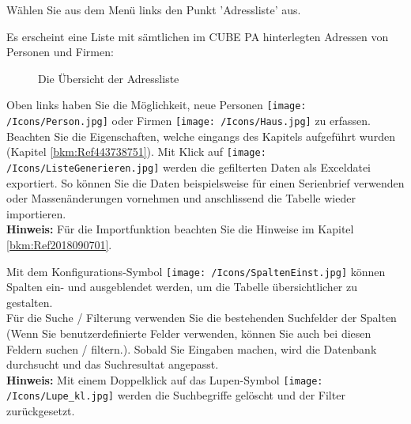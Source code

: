 Wählen Sie aus dem Menü links den Punkt 'Adressliste' aus.

\vspace{7cm}

Es erscheint eine Liste mit sämtlichen im CUBE PA hinterlegten Adressen von Personen und Firmen:

\begin{figure}[H]
\caption{Die Übersicht der Adressliste}
\end{figure}

Oben links haben Sie die Möglichkeit, neue Personen \texttt{[image: /Icons/Person.jpg]} oder Firmen \texttt{[image: /Icons/Haus.jpg]} zu erfassen. Beachten Sie die Eigenschaften, welche eingangs des Kapitels aufgeführt wurden (Kapitel \ref{bkm:Ref443738751}). \newline
Mit Klick auf \texttt{[image: /Icons/ListeGenerieren.jpg]}  werden die gefilterten Daten als Exceldatei exportiert. So können Sie die Daten beispielsweise für einen Serienbrief verwenden oder Massenänderungen vornehmen und anschlissend die Tabelle wieder importieren. \\
\textbf{Hinweis:} Für die Importfunktion beachten Sie die Hinweise im Kapitel \ref{bkm:Ref2018090701}.

\vspace{\baselineskip}

Mit dem Konfigurations-Symbol \texttt{[image: /Icons/SpaltenEinst.jpg]}  können Spalten ein- und ausgeblendet werden, um die Tabelle übersichtlicher zu gestalten. \\
Für die Suche / Filterung verwenden Sie die bestehenden Suchfelder  der Spalten (Wenn Sie benutzerdefinierte Felder verwenden, können Sie auch bei diesen Feldern suchen / filtern.). Sobald Sie Eingaben machen, wird die Datenbank durchsucht und das Suchresultat angepasst. \\
\textbf{Hinweis:} Mit einem Doppelklick auf das Lupen-Symbol \texttt{[image: /Icons/Lupe\_kl.jpg]}  werden die Suchbegriffe gelöscht und der Filter zurückgesetzt.

